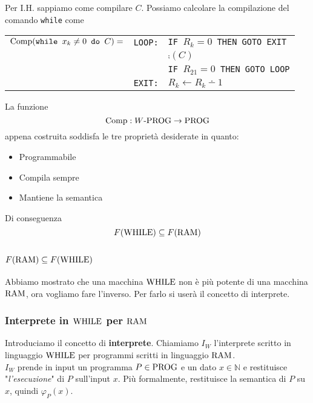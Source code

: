 Per I.H. sappiamo come compilare $C$. Possiamo calcolare la compilazione del comando \texttt{while} come
\begin{center}
	\begin{tabular}{l |r l|}
		\cline{2-3} 
		$\text{Comp}(\text{\texttt{while }} x_k \neq 0 \texttt{ do } C) = $ & \texttt{LOOP:} & \texttt{IF $R_k = 0$ THEN GOTO EXIT} \\
		&& $\comp(C)$ \\
		&& \texttt{IF $R_{21} = 0$ THEN GOTO LOOP} \\
		& \texttt{EXIT:} & $R_k \leftarrow R_k \dotminus 1$ \\
		\cline{2-3}
	\end{tabular}
\end{center}

La funzione
$$ \text{Comp}: W\text{-PROG} \rightarrow \text{PROG} $$
appena costruita soddisfa le tre proprietà desiderate in quanto:
\begin{itemize}
	\item Programmabile
	\item Compila sempre 
	\item Mantiene la semantica
\end{itemize}

Di conseguenza
$$ F(\text{WHILE}) \subseteq F (\text{RAM}) $$

\subsection{$F(\text{RAM}) \subseteq F(\text{WHILE})$}

Abbiamo mostrato che una macchina $\text{WHILE}$ non è più potente di una macchina $\text{RAM}$, ora vogliamo fare l'inverso. Per farlo si userà il concetto di interprete.\\

\subsubsection{Interprete in $\text{WHILE}$ per $\text{RAM}$}

Introduciamo il concetto di \textbf{interprete}. Chiamiamo $I_W$ l'interprete scritto in linguaggio $\text{WHILE}$ per programmi scritti in linguaggio $\text{RAM}$.\\

$I_W$ prende in input un programma $P \in \text{PROG}$ e un dato $x \in \mathbb{N}$ e restituisce "\textit{l'esecuzione}" di $P$ sull'input $x$. Più formalmente, restituisce la semantica di $P$ su $x$, quindi $\varphi_P (x)$.

\begin{center}
	
\end{center}

